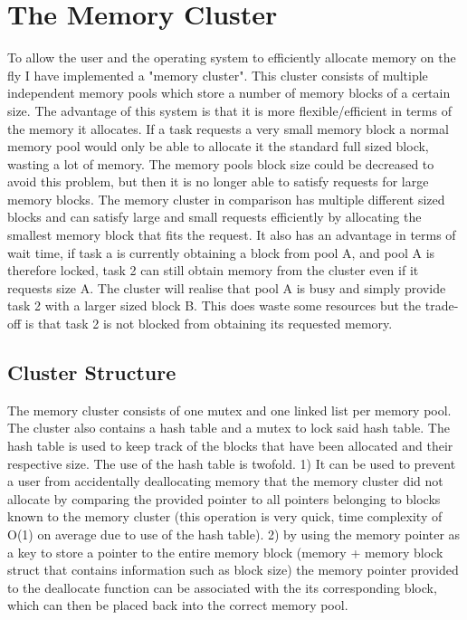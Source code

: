 \documentclass[12pt,a4paper]{article}
\begin{document}
\section{The Memory Cluster}
To allow the user and the operating system to efficiently allocate memory on the fly I have implemented a "memory cluster". This cluster consists of multiple independent memory pools which store a number of memory blocks of a certain size. The advantage of this system is that it is more flexible/efficient in terms of the memory it allocates. If a task requests a very small memory block a normal memory pool would only be able to allocate it the standard full sized block, wasting a lot of memory. The memory pools block size could be decreased to avoid this problem, but then it is no longer able to satisfy requests for large memory blocks. The memory cluster in comparison has multiple different sized blocks and can satisfy large and small requests efficiently by allocating the smallest memory block that fits the request. It also has an advantage in terms of wait time, if task a is currently obtaining a block from pool A, and pool A is therefore locked, task 2 can still obtain memory from the cluster even if it requests size A. The cluster will realise that pool A is busy and simply provide task 2 with a larger sized block B. This does waste some resources but the trade-off is that task 2 is not blocked from obtaining its requested memory.\\

\subsection{Cluster Structure}
The memory cluster consists of one mutex and one linked list per memory pool. The cluster also contains a hash table and a mutex to lock said hash table. The hash table is used to keep track of the blocks that have been allocated and their respective size. The use of the hash table is twofold. 1) It can be used to prevent a user from accidentally deallocating memory that the memory cluster did not allocate by comparing the provided pointer to all pointers belonging to blocks known to the memory cluster (this operation is very quick, time complexity of O(1) on average due to use of the hash table). 2) by using the memory pointer as a key to store a pointer to the entire memory block (memory + memory block struct that contains information such as block size) the memory pointer provided to the deallocate function can be associated with the its corresponding block, which can then be placed back into the correct memory pool.
\end{document}
